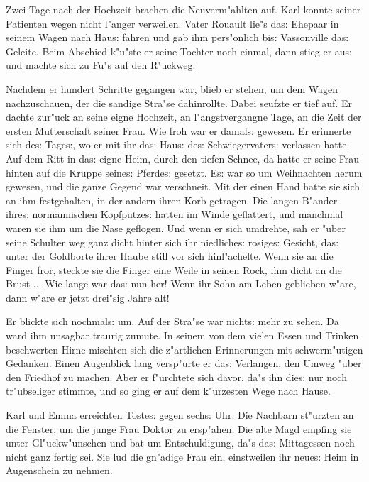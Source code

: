 \documentclass[oneside,12pt]{book}
\newcommand{\s}{s:}%
\begin{document}
Zwei Tage nach der Hochzeit brachen die Neuverm"ahlten auf. Karl
konnte seiner Patienten wegen nicht l"anger verweilen. Vater
Rouault lie"s da{\s} Ehepaar in seinem Wagen nach Hau{\s} fahren
und gab ihm pers"onlich bi{\s} Vassonville da{\s} Geleite. Beim
Abschied k"u"ste er seine Tochter noch einmal, dann stieg er
au{\s} und machte sich zu Fu"s auf den R"uckweg.

Nachdem er hundert Schritte gegangen war, blieb er stehen, um dem
Wagen nachzuschauen, der die sandige Stra"se dahinrollte. Dabei
seufzte er tief auf. Er dachte zur"uck an seine eigne Hochzeit, an
l"angstvergangne Tage, an die Zeit der ersten Mutterschaft seiner
Frau. Wie froh war er damal{\s} gewesen. Er erinnerte sich de{\s}
Tage{\s}, wo er mit ihr da{\s} Hau{\s} de{\s} Schwiegervater{\s}
verlassen hatte. Auf dem Ritt in da{\s} eigne Heim, durch den
tiefen Schnee, da hatte er seine Frau hinten auf die Kruppe
seine{\s} Pferde{\s} gesetzt. E{\s} war so um Weihnachten herum
gewesen, und die ganze Gegend war verschneit. Mit der einen Hand
hatte sie sich an ihm festgehalten, in der andern ihren Korb
getragen. Die langen B"ander ihre{\s} normannischen Kopfputze{\s}
hatten im Winde geflattert, und manchmal waren sie ihm um die Nase
geflogen. Und wenn er sich umdrehte, sah er "uber seine Schulter
weg ganz dicht hinter sich ihr niedliche{\s} rosige{\s} Gesicht,
da{\s} unter der Goldborte ihrer Haube still vor sich
hinl"achelte. Wenn sie an die Finger fror, steckte sie die Finger
eine Weile in seinen Rock, ihm dicht an die Brust ... Wie lange
war da{\s} nun her! Wenn ihr Sohn am Leben geblieben w"are, dann
w"are er jetzt drei"sig Jahre alt!

Er blickte sich nochmal{\s} um. Auf der Stra"se war nicht{\s} mehr
zu sehen. Da ward ihm unsagbar traurig zumute. In seinem von dem
vielen Essen und Trinken beschwerten Hirne mischten sich die
z"artlichen Erinnerungen mit schwerm"utigen Gedanken. Einen
Augenblick lang versp"urte er da{\s} Verlangen, den Umweg "uber
den Friedhof zu machen. Aber er f"urchtete sich davor, da"s ihn
die{\s} nur noch tr"ubseliger stimmte, und so ging er auf dem
k"urzesten Wege nach Hause.

Karl und Emma erreichten Toste{\s} gegen sech{\s} Uhr. Die
Nachbarn st"urzten an die Fenster, um die junge Frau Doktor zu
ersp"ahen. Die alte Magd empfing sie unter Gl"uckw"unschen und bat
um Entschuldigung, da"s da{\s} Mittagessen noch nicht ganz fertig
sei. Sie lud die gn"adige Frau ein, einstweilen ihr neue{\s} Heim
in Augenschein zu nehmen.
\end{document}

